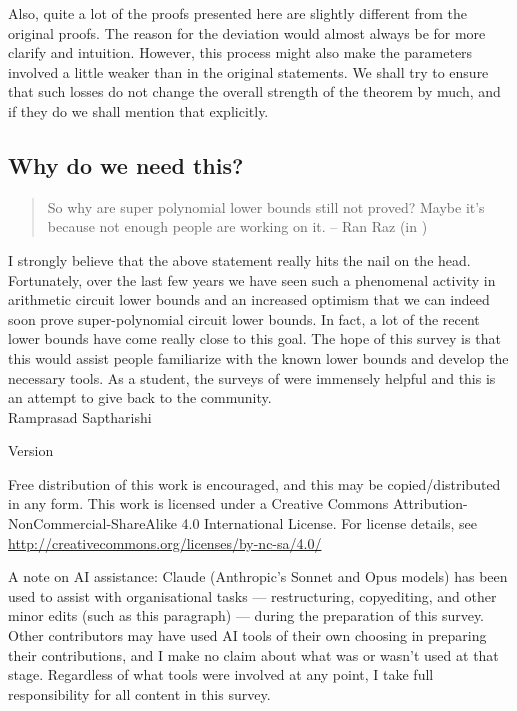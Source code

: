 Also, quite a lot of the proofs presented here are slightly different from the original proofs. 
The reason for the deviation would almost always be for more clarify and intuition. 
However, this process might also make the parameters involved a little weaker than in the original statements. 
We shall try to ensure that such losses do not change the overall strength of the theorem by much, and if they do we shall mention that explicitly. 

\subsection*{Why do we need this?}

\begin{quote}
So why are super polynomial lower bounds still not proved?  Maybe it's because not enough people are working on it.  -- Ran Raz (in \cite{raz10fool})
\end{quote}


I strongly believe that the above statement really hits the nail on the head. 
Fortunately, over the last few years we have seen such a phenomenal activity in arithmetic circuit lower bounds and an increased optimism that we can indeed soon prove super-polynomial circuit lower bounds. 
In fact, a lot of the recent lower bounds have come really close to this goal. 
The hope of this survey is that this would assist people familiarize with the known lower bounds and develop the necessary tools. 
As a student, the surveys of \cite{sy,ckw11} were immensely helpful and this is an attempt to give back to the community. \\


\noindent
Ramprasad Saptharishi

\noindent 
Version \currentversion\\

\noindent
\ccbyncsa

\medskip

\noindent
{\footnotesize Free distribution of this work is encouraged, and this may be copied/distributed in any form.
This work is licensed under a Creative Commons Attribution-NonCommercial-ShareAlike 4.0 International License.
For license details, see \url{http://creativecommons.org/licenses/by-nc-sa/4.0/}}

\medskip

\noindent
{\footnotesize A note on AI assistance: Claude (Anthropic's Sonnet and Opus models) has been used to assist with organisational tasks --- restructuring, copyediting, and other minor edits (such as this paragraph) --- during the preparation of this survey. Other contributors may have used AI tools of their own choosing in preparing their contributions, and I make no claim about what was or wasn't used at that stage. Regardless of what tools were involved at any point, I take full responsibility for all content in this survey.}
